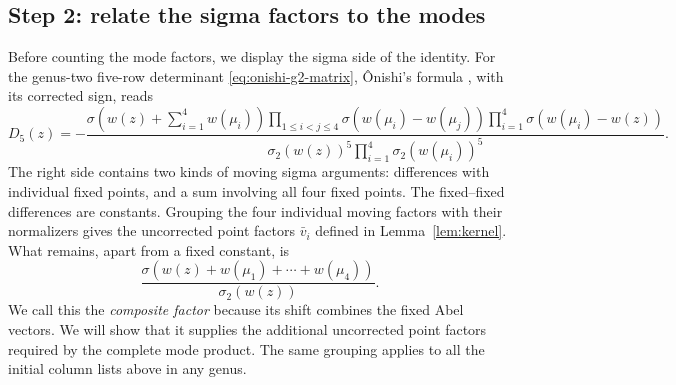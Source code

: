 \documentclass[11pt]{article}
\begin{document}
\subsection{Step 2: relate the sigma factors to the modes}

Before counting the mode factors, we display the sigma side of the identity. For the genus-two five-row determinant \eqref{eq:onishi-g2-matrix}, \^Onishi's formula \cite[Theorem~7.2]{onishi}, with its corrected sign, reads
\begin{equation}\label{eq:onishi-g2-full-sigma}
D_5(z)=-\frac{
\displaystyle\sigma\!\left(w(z)+\sum_{i=1}^4w(\mu_i)\right)
\prod_{1\le i<j\le4}\sigma\!\left(w(\mu_i)-w(\mu_j)\right)
\prod_{i=1}^4\sigma\!\left(w(\mu_i)-w(z)\right)}{
\displaystyle\sigma_2(w(z))^5\prod_{i=1}^4\sigma_2(w(\mu_i))^5}.
\end{equation}
The right side contains two kinds of moving sigma arguments: differences with individual fixed points, and a sum involving all four fixed points. The fixed--fixed differences are constants. Grouping the four individual moving factors with their normalizers gives the uncorrected point factors $\bar v_i$ defined in Lemma~\ref{lem:kernel}. What remains, apart from a fixed constant, is
\[
\frac{\sigma(w(z)+w(\mu_1)+\cdots+w(\mu_4))}{\sigma_2(w(z))}.
\]
We call this the \emph{composite factor} because its shift combines the fixed Abel vectors. We will show that it supplies the additional uncorrected point factors required by the complete mode product. The same grouping applies to all the initial column lists above in any genus.
\end{document}
